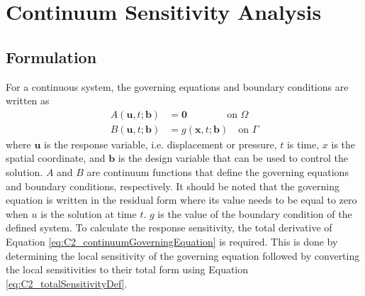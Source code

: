 \section{Continuum Sensitivity Analysis}
\subsection{Formulation}
For a continuous system, the governing equations and boundary conditions are written as
%
\begin{subequations}\label{eq:C2_continuumGoverningEquation}
\begin{align}
    A(\mathbf{u}, t; \mathbf{b}) &= \textbf{0} \qquad \qquad \text{on } \Omega \\
    B(\mathbf{u}, t; \mathbf{b}) &= g(\mathbf{x}, t; \mathbf{b}) \quad \text{on } \Gamma
\end{align}    
\end{subequations}
%
where $\mathbf{u}$ is the response variable, i.e. displacement or pressure, $t$ is time, $x$ is the spatial coordinate, and $\mathbf{b}$ is the design variable that can be used to control the solution. $A$ and $B$ are continuum functions that define the governing equations and boundary conditions, respectively. It should be noted that the governing equation is written in the residual form where its value needs to be equal to zero when $u$ is the solution at time $t$. $g$ is the value of the boundary condition of the defined system. To calculate the response sensitivity, the total derivative of Equation \eqref{eq:C2_continuumGoverningEquation} is required. This is done by determining the local sensitivity of the governing equation followed by converting the local sensitivities to their total form using Equation \eqref{eq:C2_totalSensitivityDef}.

